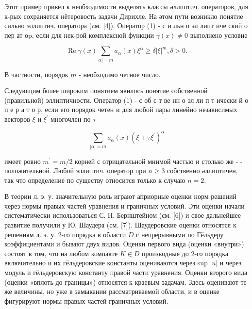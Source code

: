 \documentclass[10pt]{article}
\begin{document}
Этот пример привел к необходимости выделять классы әллиптич. операторов, для к-рых сохраняется нётеровость задачи Дирихле. На әтом пути возникло понятие сильно эллиптич. оператора (cм. [4]). Оператор (1) - с и льн о эл липт иче ский о пер ат $о \mathrm{p}$, если для нек-рой комплексной функции $\gamma(x) \neq 0$ выполнено условие



\[

\operatorname{Re} \gamma(x) \sum_{\alpha \mid=m} a_{\alpha}(x) \xi^{\alpha} \geqslant \delta|\xi|^{m}, \delta>0 .

\]



В частности, порядок $m$ - необходимо четное число.



Следующим более широким понятием явилось понятие собственной (правильной) эллиптичности. Оператор (1) - с об с т ве нн о эл ли п т ически й о п е р а т о р, если его порядок четен и для любой пары линейно независимых векторов $\xi$ и $\xi^{\prime}$ многочлен по $\tau$



\[

\sum_{|\alpha|=m} a_{\alpha}(x)\left(\xi+\tau \xi^{\prime}\right)^{\alpha}

\]



имеет ровно $m^{\prime}=m / 2$ корней с отрицательной мнимой частью и столько же - - положительной. Любой эллиптич. оператор при $n \geqslant 3$ собственно әллиптичен, так что определение по существу относится только к случаю $n=2$.



В теории л. э. у. значительную роль играют априорные оценки норм решений через нормы правых частей уравнения и граничных условий. Эти оценки начали систематически использоваться С. Н. Бернштейном (см. [6]) и свое дальнейшее развитие получили у Ю. Шаудера (см. [7]). Шаудеровские оценки относятся к решениям л. э. у. 2-го порядка в области $D$ с непрерывными по Гёльдеру коэффициентами и бывают двух видов. Оценки первого вида (оценки «внутри») состоят в том, что на любом компакте $K \in D$ производные до 2-го порядка включительно и их гёльдеровские константы оцениваются через sup $|u|$ и через модуль и гёльдеровскую константу правой части уравнения. Оценки второго вида (оценки «вплоть до границы») относятся к краевым задачам. Здесь оценивают те же величины, но уже в замыкании рассматриваемой области, и в оценке фигурируют нормы правых частей граничных условий.
\end{document}
